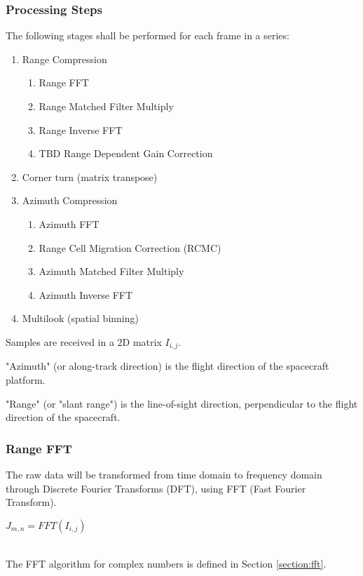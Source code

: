 \subsubsection{Processing Steps}
The following stages shall be performed for each frame in a series:

\begin{enumerate}
    \item Range Compression
    \begin{enumerate}
        \item Range FFT 
        \item Range Matched Filter Multiply
        \item Range Inverse FFT
        \item TBD Range Dependent Gain Correction
    \end{enumerate}
    \item Corner turn (matrix transpose)
    \item Azimuth Compression 
    \begin{enumerate}
        \item Azimuth FFT 
        \item Range Cell Migration Correction (RCMC)
        \item Azimuth Matched Filter Multiply
        \item Azimuth Inverse FFT
    \end{enumerate}
    \item Multilook (spatial binning)
\end{enumerate}

Samples are received in a 2D matrix \(I_{i,j}\). 

"Azimuth" (or along-track direction) is the flight direction of the spacecraft platform.

"Range" (or "slant range") is the line-of-sight direction, perpendicular to the flight direction of the spacecraft.

\subsubsection{Range FFT}
The raw data will be transformed from time domain to frequency domain through Discrete Fourier Transforms (DFT), using FFT (Fast Fourier Transform). 

\begin{center}
\(J_{m,n} = FFT(I_{i,j}) \)
\end{center}
\\
The FFT algorithm for complex numbers is defined in Section \ref{section:fft}.

